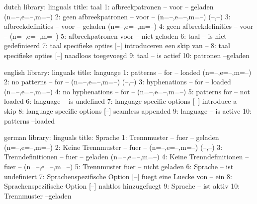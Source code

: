 



\startmessages  dutch  library: linguals
  title: taal
      1: afbreekpatronen -- voor -- geladen (n=--,e=--,m=--)
      2: geen afbreekpatronen -- voor -- (n=--,e=--,m=--) (--,--)
      3: afbreekdefinities -- voor -- geladen (n=--,e=--,m=--)
      4: geen afbreekdefinities -- voor -- (n=--,e=--,m=--)
      5: afbreekpatronen voor -- niet geladen
      6: taal -- is niet gedefinieerd
      7: taal specifieke opties [--] introduceren een skip van --
      8: taal specifieke opties [--] naadloos toegevoegd
      9: taal -- is actief
     10: patronen --geladen
\stopmessages

\startmessages  english  library: linguals
  title: language
      1: patterns -- for -- loaded (n=--,e=--,m=--)
      2: no patterns -- for -- (n=--,e=--,m=--) (--,--)
      3: hyphenations -- for -- loaded (n=--,e=--,m=--)
      4: no hyphenations -- for -- (n=--,e=--,m=--)
      5: patterns for -- not loaded
      6: language -- is undefined
      7: language specific options [--] introduce a -- skip
      8: language specific options [--] seamless appended
      9: language -- is active
     10: patterns --loaded
\stopmessages

\startmessages  german  library: linguals
  title: Sprache
      1: Trennmuster -- fuer -- geladen (n=--,e=--,m=--)
      2: Keine Trennmuster -- fuer -- (n=--,e=--,m=--) (--,--)
      3: Trenndefinitionen -- fuer -- geladen (n=--,e=--,m=--)
      4: Keine Trenndefinitionen -- fuer -- (n=--,e=--,m=--)
      5: Trennmuster fuer -- nicht geladen
      6: Sprache -- ist undefiniert
      7: Sprachenspezifische Option [--] fuegt eine Luecke von -- ein
      8: Sprachenspezifische Option [--] nahtlos hinzugefuegt
      9: Sprache -- ist aktiv
     10: Trennmuster --geladen
\stopmessages

